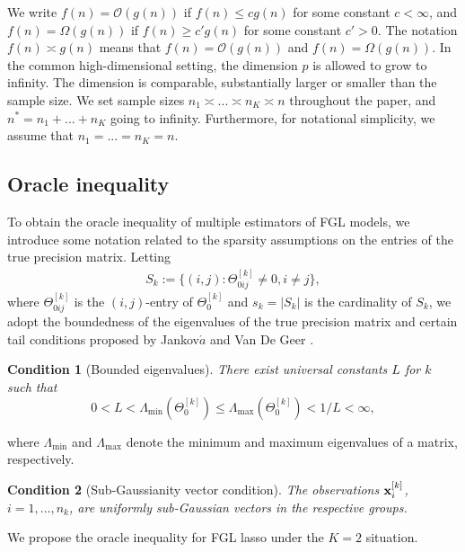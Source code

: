 \documentclass[review]{elsarticle}
\newcommand{\bbx}{{\bf x}}
\newcommand{\1}{{\bf 1}}
\newcommand{\0}{{\bf 0}}
\newcommand{\bqa}{\begin{eqnarray}}
\newcommand{\eqa}{\end{eqnarray}}
\newtheorem{condition}{Condition}
\begin{document}
 We write $f(n)=\mathcal{O}(g(n))$ if $f(n)\leq cg(n)$ for some constant $c<\infty$, and $f(n)=\Omega(g(n))$ if $f(n)\geq c'g(n)$ for some constant $c'>0$.
 The notation $f(n)\asymp g(n)$ means that $f(n) = \mathcal{O}(g(n))$ and $f(n)=\Omega(g(n))$.
 In the common high-dimensional setting, the dimension $p$ is allowed to grow to infinity.
 The dimension is comparable, substantially larger or smaller than the sample size.
 We set sample sizes $ n_1\asymp ...\asymp n_K \asymp n$ throughout the paper, and $n^*=n_1+...+n_K$ going to infinity.
 Furthermore, for notational simplicity, we assume that $n_1=...=n_K=n$.


\subsection{Oracle inequality}

 To obtain the oracle inequality of multiple estimators of FGL models, we introduce some notation related to the sparsity assumptions on the entries of the true precision matrix.
 Letting
\bqa
S_k:=\{(i,j):\Theta^{[k]}_{0ij}\neq 0,i\neq j\},
\eqa
 where $\Theta^{[k]}_{0ij}$ is the $(i,j)$-entry of $\Theta^{[k]}_{0}$ and $s_k=|S_k|$ is the cardinality of $S_k$, we adopt the boundedness of the eigenvalues of the true precision matrix and certain tail conditions proposed by Jankov$\acute{a}$ and Van De Geer \cite{jankova2015confidence}.
\begin{condition}[Bounded eigenvalues]
There exist universal constants $L$ for $k$ such that
\begin{equation*}
0 <L < \Lambda_{\mathrm{min}}(\Theta_{0}^{[k]}) \leq \Lambda_{\mathrm{max}}(\Theta_{0}^{[k]}) <1/L<\infty,
\end{equation*}
\end{condition}
 where $\Lambda_{\mathrm{min}}$ and $\Lambda_{\mathrm{max}}$ denote the minimum and maximum eigenvalues of a matrix, respectively.

\begin{condition}[Sub-Gaussianity vector condition]
The observations $\bbx_i^{[k]}$, $i=1,\dots,n_k$, are uniformly sub-Gaussian vectors in the respective groups.
\end{condition}

 We propose the oracle inequality for FGL lasso under the $K=2$ situation.
\end{document}
